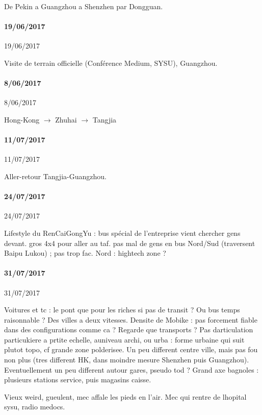 De Pekin a Guangzhou a Shenzhen par Dongguan.

\paragraph{19/06/2017}{19/06/2017}

Visite de terrain officielle (Conférence Medium, SYSU), Guangzhou.

\paragraph{8/06/2017}{8/06/2017}

Hong-Kong $\rightarrow$ Zhuhai $\rightarrow$ Tangjia


\paragraph{11/07/2017}{11/07/2017}

Aller-retour Tangjia-Guangzhou.


\paragraph{24/07/2017}{24/07/2017}

Lifestyle du RenCaiGongYu : bus spécial de l'entreprise vient chercher gens devant. gros 4x4 pour aller au taf. pas mal de gens en bus Nord/Sud (traversent Baipu Lukou) ; pas trop fac. Nord : hightech zone ?




\paragraph{31/07/2017}{31/07/2017}

Voitures et tc : le pont que pour les riches si pas de transit ? Ou bus temps raisonnable ?
Des villes a deux vitesses.
Densite de Mobike : pas forcement fiable dans des configurations comme ca ?
Regarde que transports ? Pas darticulation particukiere a prtite echelle, auniveau archi, ou urba : forme urbaine qui suit plutot topo, cf grande zone polderisee. Un peu different centre ville, mais pas fou non plus (tres different HK, dans moindre mesure Shenzhen puis Guangzhou). Eventuellement un peu different autour gares, pseudo tod ?
Grand axe bagnoles : plusieurs stations service, puis magasins caisse.

Vieux weird, gueulent, mec affale les pieds en l'air.
Mec qui rentre de lhopital sysu, radio medocs.

